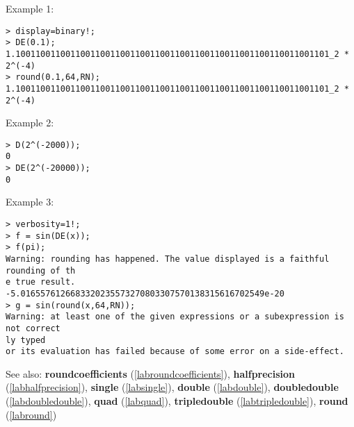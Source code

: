 \noindent Example 1: 
\begin{center}\begin{minipage}{15cm}\begin{Verbatim}[frame=single]
> display=binary!;
> DE(0.1);
1.100110011001100110011001100110011001100110011001100110011001101_2 * 2^(-4)
> round(0.1,64,RN);
1.100110011001100110011001100110011001100110011001100110011001101_2 * 2^(-4)
\end{Verbatim}
\end{minipage}\end{center}
\noindent Example 2: 
\begin{center}\begin{minipage}{15cm}\begin{Verbatim}[frame=single]
> D(2^(-2000));
0
> DE(2^(-20000));
0
\end{Verbatim}
\end{minipage}\end{center}
\noindent Example 3: 
\begin{center}\begin{minipage}{15cm}\begin{Verbatim}[frame=single]
> verbosity=1!;
> f = sin(DE(x));
> f(pi);
Warning: rounding has happened. The value displayed is a faithful rounding of th
e true result.
-5.0165576126683320235573270803307570138315616702549e-20
> g = sin(round(x,64,RN));
Warning: at least one of the given expressions or a subexpression is not correct
ly typed
or its evaluation has failed because of some error on a side-effect.
\end{Verbatim}
\end{minipage}\end{center}
See also: \textbf{roundcoefficients} (\ref{labroundcoefficients}), \textbf{halfprecision} (\ref{labhalfprecision}), \textbf{single} (\ref{labsingle}), \textbf{double} (\ref{labdouble}), \textbf{doubledouble} (\ref{labdoubledouble}), \textbf{quad} (\ref{labquad}), \textbf{tripledouble} (\ref{labtripledouble}), \textbf{round} (\ref{labround})
